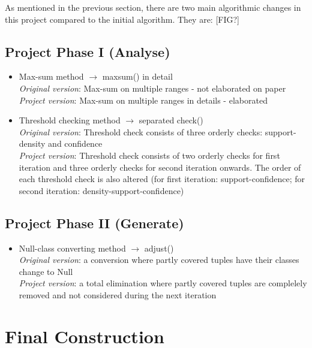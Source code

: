 As mentioned in the previous section, there are two main algorithmic changes in this project compared to the initial algorithm. They are:
[FIG?]

\subsection{Project Phase I (Analyse)}

\begin{itemize}
	\item Max-sum method $\rightarrow$ maxsum() in detail \\
	\textit{Original version}: Max-sum on multiple ranges - not elaborated on paper \\
	\textit{Project version}: Max-sum on multiple ranges in details - elaborated \\

	\item Threshold checking method $\rightarrow$ separated check() \\
	\textit{Original version}: Threshold check consists of three orderly checks: support-density and confidence \\
	\textit{Project version}: Threshold check consists of two orderly checks for first iteration and three orderly checks for second iteration onwards. The order of each threshold check is also altered (for first iteration: support-confidence; for second iteration: density-support-confidence) \\
\end{itemize}

\subsection{Project Phase II (Generate)}

\begin{itemize}
	\item Null-class converting method $\rightarrow$ adjust() \\
	\textit{Original version}: a conversion where partly covered tuples have their classes change to Null \\
	\textit{Project version}: a total elimination where partly covered tuples are complelely removed and not considered during the next iteration \\
\end{itemize}


\section{Final Construction}